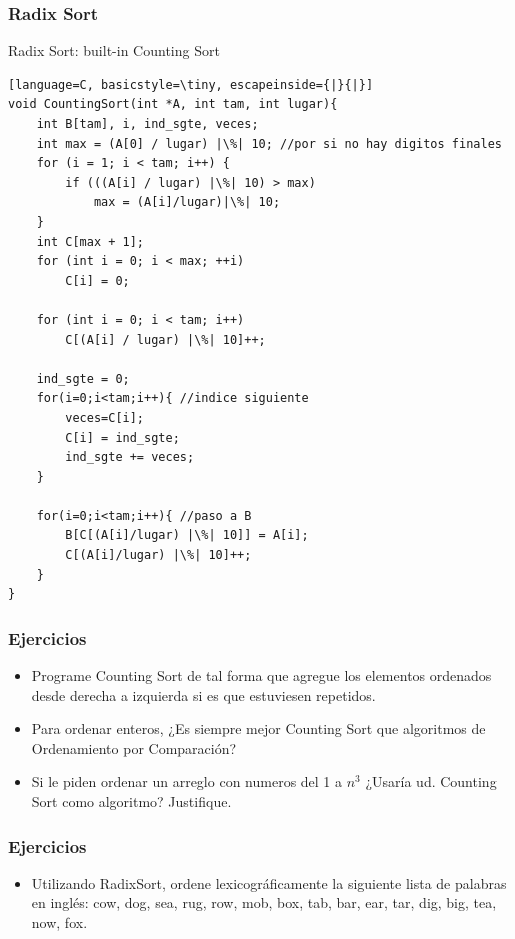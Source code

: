 \documentclass{beamer}
\begin{document}
\begin{frame}[fragile]
 \frametitle{Radix Sort}
\begin{exampleblock}{Radix Sort: built-in Counting Sort}
\begin{lstlisting}[language=C, basicstyle=\tiny, escapeinside={|}{|}]
void CountingSort(int *A, int tam, int lugar){
	int B[tam], i, ind_sgte, veces;
	int max = (A[0] / lugar) |\%| 10; //por si no hay digitos finales
	for (i = 1; i < tam; i++) {
		if (((A[i] / lugar) |\%| 10) > max)
			max = (A[i]/lugar)|\%| 10;
	}
	int C[max + 1];
	for (int i = 0; i < max; ++i)
		C[i] = 0;

	for (int i = 0; i < tam; i++)
		C[(A[i] / lugar) |\%| 10]++;
  
	ind_sgte = 0;
	for(i=0;i<tam;i++){ //indice siguiente
		veces=C[i];
		C[i] = ind_sgte;		
		ind_sgte += veces;
	}

	for(i=0;i<tam;i++){ //paso a B
		B[C[(A[i]/lugar) |\%| 10]] = A[i];
		C[(A[i]/lugar) |\%| 10]++;
	}
}
\end{lstlisting}
\end{exampleblock}
\end{frame}

\begin{frame}[fragile]
 \frametitle{Ejercicios}
\begin{itemize}
\item Programe Counting Sort de tal forma que agregue los elementos ordenados desde derecha a izquierda si es que estuviesen repetidos.
\item Para ordenar enteros, ¿Es siempre mejor Counting Sort que algoritmos de Ordenamiento por Comparación? 
\item Si le piden ordenar un arreglo con numeros del 1 a $n^3$ ¿Usaría ud. Counting Sort como algoritmo? Justifique.  
\end{itemize}
\end{frame}

\begin{frame}[fragile]
 \frametitle{Ejercicios}
\begin{itemize}
\item Utilizando RadixSort, ordene lexicográficamente la siguiente lista de palabras en inglés: cow, dog, sea, rug, row, mob, box, tab, bar, ear, tar, dig, big, tea, now, fox.
\end{itemize}
\end{frame}
\end{document}
